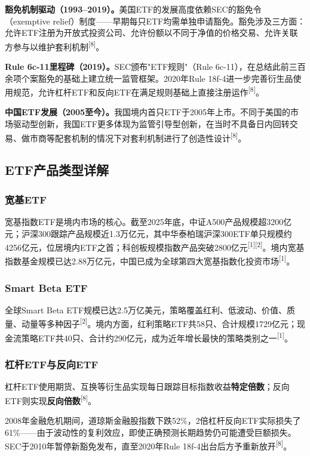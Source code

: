\documentclass[10pt,a4paper,twocolumn]{ctexart}
\begin{document}
\textbf{豁免机制驱动（1993--2019）。}美国ETF的发展高度依赖SEC的豁免令（exemptive relief）制度——早期每只ETF均需单独申请豁免。豁免涉及三方面：允许ETF注册为开放式投资公司、允许份额以不同于净值的价格交易、允许关联方参与以维护套利机制\textsuperscript{[8]}。

\textbf{Rule 6c-11里程碑（2019）。}SEC颁布"ETF规则"（Rule 6c-11），在总结此前三百余项个案豁免的基础上建立统一监管框架。2020年Rule 18f-4进一步完善衍生品使用规范，允许杠杆ETF和反向ETF在满足规则基础上直接注册运作\textsuperscript{[8]}。

\textbf{中国ETF发展（2005至今）。}我国境内首只ETF于2005年上市。不同于美国的市场驱动型创新，我国ETF更多体现为监管引导型创新，在当时不具备日内回转交易、做市商等配套机制的情况下对套利机制进行了创造性设计\textsuperscript{[8]}。

\subsection{ETF产品类型详解}

\subsubsection{宽基ETF}

宽基指数ETF是境内市场的核心。截至2025年底，中证A500产品规模超3200亿元；沪深300跟踪产品规模近1.3万亿元，其中华泰柏瑞沪深300ETF单只规模约4256亿元，位居境内ETF之首；科创板规模指数产品突破2800亿元\textsuperscript{[1][2]}。境内宽基指数基金规模已达2.88万亿元，中国已成为全球第四大宽基指数化投资市场\textsuperscript{[1]}。

\subsubsection{Smart Beta ETF}

全球Smart Beta ETF规模已达2.5万亿美元，策略覆盖红利、低波动、价值、质量、动量等多种因子\textsuperscript{[2]}。境内方面，红利策略ETF共58只、合计规模1729亿元；现金流策略ETF共40只、合计约290亿元，成为近年增长最快的策略类别之一\textsuperscript{[1]}。

\subsubsection{杠杆ETF与反向ETF}

杠杆ETF使用期货、互换等衍生品实现每日跟踪目标指数收益\textbf{特定倍数}；反向ETF则实现\textbf{反向倍数}\textsuperscript{[8]}。

\begin{infobox}
2008年金融危机期间，道琼斯金融股指数下跌52\%，2倍杠杆反向ETF实际损失了61\%——由于波动性的复利效应，即使正确预测长期趋势仍可能遭受巨额损失。SEC于2010年暂停新豁免发布，直至2020年Rule 18f-4出台后方予重新放开\textsuperscript{[8]}。
\end{infobox}
\end{document}

